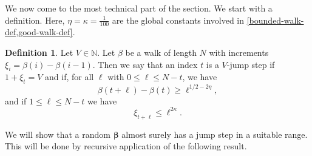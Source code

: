 \documentclass[11pt,reqno]{amsart}
\numberwithin{equation}{section}
\theoremstyle{definition}
\newtheorem{definition}[theorem]{Definition}
\theoremstyle{remark}
\def\boldbeta{\boldsymbol\beta}
\renewcommand{\le}{\leqslant}
\renewcommand{\ge}{\geqslant}
\newcommand\N{\mathbb{N}}
\begin{document}
We now come to the most technical part of the section. We start with a definition. Here, $\eta = \kappa = \frac{1}{100}$ are the global constants involved in \cref{bounded-walk-def,good-walk-def}.
\begin{definition}\label{jump-step-7}
Let $V \in \N$. Let $\beta$ be a walk of length $N$ with increments $\xi_i = \beta(i) - \beta(i-1)$. Then we say that an index $t$ is a $V$-jump step if $1 + \xi_t = V$ and if, for all $\ell$ with $0 \le \ell \le N - t$, we have
\begin{equation}\label{jump-step-1}
\beta(t + \ell) - \beta(t) \ge \ell^{1/2 - 2\eta},
\end{equation}
and if $1 \le \ell \le N - t$ we have
\begin{equation}\label{jump-step-2}
\xi_{t + \ell} \le \ell^{2\kappa}.    
\end{equation}
\end{definition}

We will show that a random $\boldbeta$ almost surely has a jump step in a suitable range. This will be done by recursive application of the following result.
\end{document}
